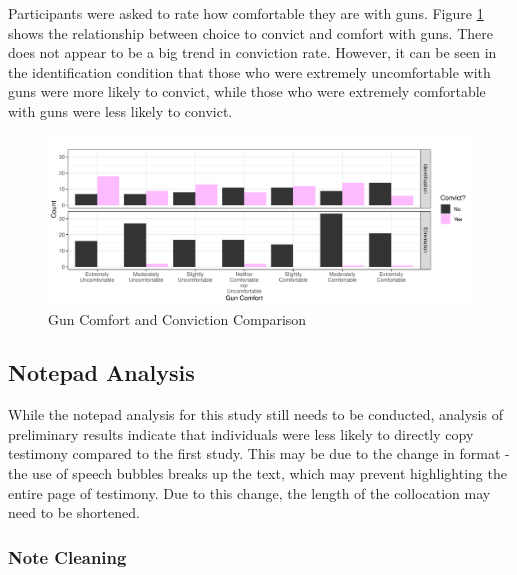 \documentclass[print]{nuthesis}
\begin{document}
Participants were asked to rate how comfortable they are with guns.
Figure \ref{fig:convictscomfort} shows the relationship between choice to convict and comfort with guns.
There does not appear to be a big trend in conviction rate.
However, it can be seen in the identification condition that those who were extremely uncomfortable with guns were more likely to convict, while those who were extremely comfortable with guns were less likely to convict.

\begin{figure}

{\centering \includegraphics[width=\linewidth]{thesis_files/figure-latex/convictscomfort-1} 

}

\caption{Gun Comfort and Conviction Comparison}\label{fig:convictscomfort}
\end{figure}

\hypertarget{notepad-analysis}{%
\subsection{Notepad Analysis}\label{notepad-analysis}}

While the notepad analysis for this study still needs to be conducted, analysis of preliminary results indicate that individuals were less likely to directly copy testimony compared to the first study.
This may be due to the change in format - the use of speech bubbles breaks up the text, which may prevent highlighting the entire page of testimony.
Due to this change, the length of the collocation may need to be shortened.

\hypertarget{note-cleaning}{%
\subsubsection{Note Cleaning}\label{note-cleaning}}
\end{document}

